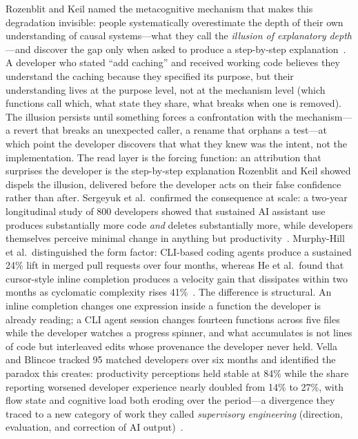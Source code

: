 Rozenblit and Keil named the metacognitive
mechanism that makes this degradation invisible: people systematically
overestimate the depth of their own understanding of causal systems---what they
call the \emph{illusion of explanatory depth}---and discover the gap only when
asked to produce a step-by-step explanation~\cite{rozenblit2002}. A developer who
stated ``add caching'' and received working code believes they understand the
caching because they specified its purpose, but their understanding lives at the
purpose level, not at the mechanism level (which functions call which, what state
they share, what breaks when one is removed). The illusion persists until
something forces a confrontation with the mechanism---a revert that breaks an
unexpected caller, a rename that orphans a test---at which point the developer
discovers that what they knew was the intent, not the implementation. The read
layer is the forcing function: an attribution that surprises the developer is the
step-by-step explanation Rozenblit and Keil showed dispels the illusion, delivered
before the developer acts on their false confidence rather than after.
Sergeyuk et al.\ confirmed the consequence at scale: a two-year longitudinal
study of 800 developers showed that sustained AI assistant use produces
substantially more code \emph{and} deletes substantially more, while developers
themselves perceive minimal change in anything but
productivity~\cite{sergeyuk2026}. Murphy-Hill et al.\ distinguished the form
factor: CLI-based coding agents produce a sustained 24\% lift in merged pull
requests over four months, whereas He et al.\ found that cursor-style inline
completion produces a velocity gain that dissipates within two months as
cyclomatic complexity rises 41\%~\cite{murphyhill2026,he2026}. The difference is
structural. An inline completion changes one expression inside a function the
developer is already reading; a CLI agent session changes fourteen functions
across five files while the developer watches a progress spinner, and what
accumulates is not lines of code but interleaved edits whose provenance the
developer never held. Vella and Blincoe tracked 95 matched developers over six months and identified
the paradox this creates: productivity perceptions held stable at 84\% while the
share reporting worsened developer experience nearly doubled from 14\% to 27\%,
with flow state and cognitive load both eroding over the period---a divergence
they traced to a new category of work they called \emph{supervisory engineering}
(direction, evaluation, and correction of AI output)~\cite{vella2026longitudinal}.
